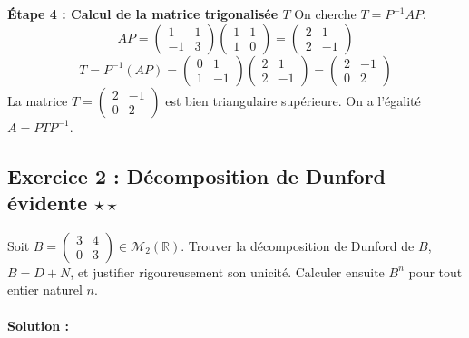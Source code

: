 \documentclass[11pt,a4paper]{article}
\begin{document}
\textbf{Étape 4 : Calcul de la matrice trigonalisée $T$}
On cherche $T = P^{-1} A P$.
$$ AP = \begin{pmatrix} 1 & 1 \\ -1 & 3 \end{pmatrix} \begin{pmatrix} 1 & 1 \\ 1 & 0 \end{pmatrix} = \begin{pmatrix} 2 & 1 \\ 2 & -1 \end{pmatrix} $$
$$ T = P^{-1} (AP) = \begin{pmatrix} 0 & 1 \\ 1 & -1 \end{pmatrix} \begin{pmatrix} 2 & 1 \\ 2 & -1 \end{pmatrix} = \begin{pmatrix} 2 & -1 \\ 0 & 2 \end{pmatrix} $$
La matrice $T = \begin{pmatrix} 2 & -1 \\ 0 & 2 \end{pmatrix}$ est bien triangulaire supérieure. On a l'égalité $A = P T P^{-1}$.

\vspace{1cm}
\subsection*{Exercice 2 : Décomposition de Dunford évidente $\star\star$}

Soit $B = \begin{pmatrix} 3 & 4 \\ 0 & 3 \end{pmatrix} \in \mathcal{M}_2(\mathbb{R})$.
Trouver la décomposition de Dunford de $B$, $B = D + N$, et justifier rigoureusement son unicité. Calculer ensuite $B^n$ pour tout entier naturel $n$.

\paragraph*{Solution :}
\end{document}
